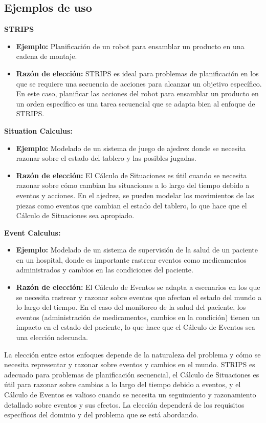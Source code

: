 \subsection{Ejemplos de uso}
\textbf{STRIPS}
\begin{itemize}
  \item \textbf{Ejemplo:} Planificación de un robot para ensamblar un producto en una cadena de montaje.
  \item \textbf{Razón de elección:} STRIPS es ideal para problemas de planificación en los que se requiere una secuencia de acciones para alcanzar un objetivo específico. En este caso, planificar las acciones del robot para ensamblar un producto en un orden específico es una tarea secuencial que se adapta bien al enfoque de STRIPS.
\end{itemize}

\textbf{Situation Calculus: }
\begin{itemize}
  \item \textbf{Ejemplo:} Modelado de un sistema de juego de ajedrez donde se necesita razonar sobre el estado del tablero y las posibles jugadas.
  \item \textbf{Razón de elección:} El Cálculo de Situaciones es útil cuando se necesita razonar sobre cómo cambian las situaciones a lo largo del tiempo debido a eventos y acciones. En el ajedrez, se pueden modelar los movimientos de las piezas como eventos que cambian el estado del tablero, lo que hace que el Cálculo de Situaciones sea apropiado.
\end{itemize}

\textbf{Event Calculus:}
\begin{itemize}
  \item \textbf{Ejemplo:} Modelado de un sistema de supervisión de la salud de un paciente en un hospital, donde es importante rastrear eventos como medicamentos administrados y cambios en las condiciones del paciente.
  \item \textbf{Razón de elección:} El Cálculo de Eventos se adapta a escenarios en los que se necesita rastrear y razonar sobre eventos que afectan el estado del mundo a lo largo del tiempo. En el caso del monitoreo de la salud del paciente, los eventos (administración de medicamentos, cambios en la condición) tienen un impacto en el estado del paciente, lo que hace que el Cálculo de Eventos sea una elección adecuada.
\end{itemize}

La elección entre estos enfoques depende de la naturaleza del problema y cómo se necesita representar y razonar sobre eventos y cambios en el mundo. STRIPS es adecuado para problemas de planificación secuencial, el Cálculo de Situaciones es útil para razonar sobre cambios a lo largo del tiempo debido a eventos, y el Cálculo de Eventos es valioso cuando se necesita un seguimiento y razonamiento detallado sobre eventos y sus efectos. La elección dependerá de los requisitos específicos del dominio y del problema que se está abordando.
